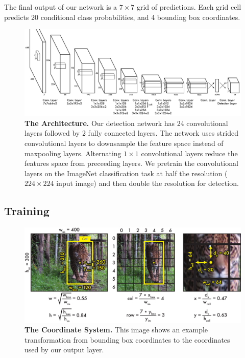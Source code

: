 \documentclass{article} %
\begin{document}
The final output of our network is a $7 \times 7$ grid of predictions. Each grid cell predicts 20 conditional class probabilities, and 4 bounding box coordinates.

   \begin{figure}[h]
      \centering
        \includegraphics[width=\linewidth]{detectnet2}
      \caption{\textbf{The Architecture.} Our detection network has 24 convolutional layers followed by 2 fully connected layers. The network uses strided convolutional layers to downsample the feature space instead of maxpooling layers. Alternating $1 \times 1$ convolutional layers reduce the features space from preceeding layers. We pretrain the convolutional layers on the ImageNet classification task at half the resolution ($224 \times 224$ input image) and then double the resolution for detection.}
      \label{net}
   \end{figure}

\subsection{Training}

   \begin{figure}[t]
      \centering
        \includegraphics[width=.8\linewidth]{transform}
      \caption{\textbf{The Coordinate System.} This image shows an example transformation from bounding box coordinates to the coordinates used by our output layer.}
      \label{transform}
   \end{figure}
\end{document}
